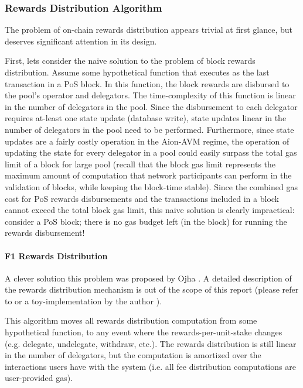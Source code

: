 \subsubsection{Rewards Distribution Algorithm} \label{f1-rewards}

 The problem of on-chain rewards distribution appears trivial at first glance, but deserves significant attention in its design.  

First, lets consider the naive solution to the problem of block rewards distribution. Assume some hypothetical  function that executes as the last transaction in a PoS block. In this function, the block rewards are disbursed to the pool's operator and delegators. The time-complexity of this function is linear in the number of delegators in the pool. Since the disbursement to each delegator requires at-least one state update (database write), state updates linear in the number of delegators in the pool need to be performed. Furthermore, since state updates are a fairly costly operation in the Aion-AVM regime, the operation of updating the state for every delegator in a pool could easily surpass the total gas limit of a block for large pool (recall that the block gas limit represents the maximum amount of computation that network participants can perform in the validation of blocks, while keeping the block-time stable). Since the combined gas cost for PoS rewards disbursements and the transactions included in a block cannot exceed the total block gas limit, this naive solution is clearly impractical: consider a  PoS block; there is no gas budget left (in the block) for running the rewards disbursement!  

\paragraph*{F1 Rewards Distribution} A clever solution this problem was proposed by Ojha \cite{Ojh19}. A detailed description of the rewards distribution mechanism is out of the scope of this report (please refer to \cite{Ojh19} or a toy-implementation by the author \cite{Sha19}). 

This algorithm moves all rewards distribution computation from some hypothetical  function, to any event where the rewards-per-unit-stake changes (e.g. delegate, undelegate, withdraw, etc.). The rewards distribution is still linear in the number of delegators, but the computation is amortized over the interactions users have with the system (i.e. all fee distribution computations are  user-provided gas).   

